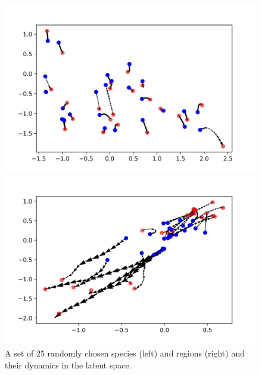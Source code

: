 \documentclass[
	11pt, %
]{beamer}
\begin{document}
\begin{frame}
\begin{figure}[H] 
  \label{ fig7} 
  \begin{minipage}[b]{0.5\linewidth}
    \centering
    \includegraphics[width=\linewidth]{latentspace_afew_species.png} 
    \vspace{4ex}
  \end{minipage}%
  \begin{minipage}[b]{0.5\linewidth}
    \centering
    \includegraphics[width=\linewidth]{latentspace_afew_region.png} 
    \vspace{4ex}
  \end{minipage}  
\caption{A set of 25 randomly chosen species (left) and regions (right) and their dynamics in the latent space.}
\label{fig:latentspace_afew}
\end{figure}
\end{frame}
\end{document}
